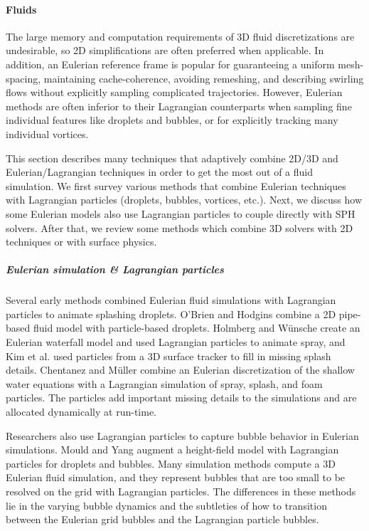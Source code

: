 \paragraph{Fluids}

The large memory and computation requirements of 3D fluid discretizations are undesirable, so 2D simplifications are often preferred when applicable. In addition, an Eulerian reference frame is popular for guaranteeing a uniform mesh-spacing, maintaining cache-coherence, avoiding remeshing, and describing swirling flows without explicitly sampling complicated trajectories. However, Eulerian methods are often inferior to their Lagrangian counterparts when sampling fine individual features like droplets and bubbles, or for explicitly tracking many individual vortices.

This section describes many techniques that adaptively combine 2D/3D and Eulerian/Lagrangian techniques in order to get the most out of a fluid simulation. We first survey various methods that combine Eulerian techniques with Lagrangian particles (droplets, bubbles, vortices, etc.). Next, we discuss how some Eulerian models also use Lagrangian particles to couple directly with SPH solvers. After that, we review some methods which combine 3D solvers with 2D techniques or with surface physics.

\subparagraph*{Eulerian simulation \& Lagrangian particles}

Several early methods combined Eulerian fluid simulations with Lagrangian particles to animate splashing droplets. O'Brien and Hodgins \cite{OBrien1995} combine a 2D pipe-based fluid model with particle-based droplets. Holmberg and W\"unsche \cite{Holmberg2004} create an Eulerian waterfall model and used Lagrangian particles to animate spray, and Kim et al. \cite{Kim2006:Splash} used particles from a 3D surface tracker to fill in missing splash details. Chentanez and M\"uller \cite{Chentanez2010} combine an Eulerian discretization of the shallow water equations with a Lagrangian simulation of spray, splash, and foam particles. The particles add important missing details to the simulations and are allocated dynamically at run-time.

Researchers also use Lagrangian particles to capture bubble behavior in Eulerian simulations. Mould and Yang \cite{Mould1997} augment a height-field model with Lagrangian particles for droplets and bubbles. Many simulation methods \cite{Greenwood:2004:BBE:1028523.1028562,Hong2008Bubbles,Patkar2013} compute a 3D Eulerian fluid simulation, and they represent bubbles that are too small to be resolved on the grid with Lagrangian particles. The differences in these methods lie in the varying bubble dynamics and the subtleties of how to transition between the Eulerian grid bubbles and the Lagrangian particle bubbles.

